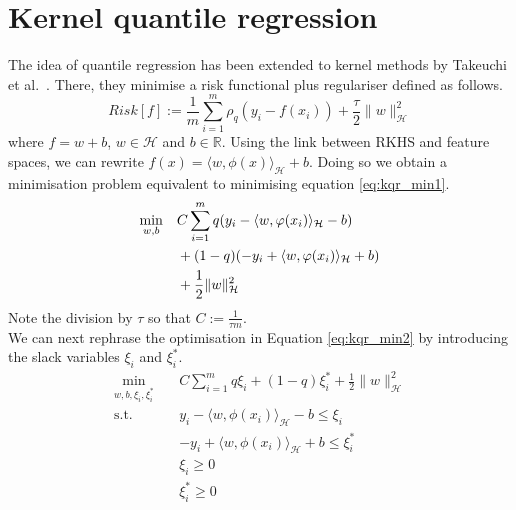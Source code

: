 \section{Kernel quantile regression}
The idea of quantile regression has been extended to kernel methods by Takeuchi et al.\ \cite{takeuchi2006nonparametric}.
There, they minimise a risk functional plus regulariser defined as follows.
\begin{equation}\label{eq:kqr_min1}
    Risk[f]:=\frac{1}{m}\sum\limits_{i=1}^{m}\rho_q(y_i-f(x_i))+\frac{\tau}{2}\|w\|_\mathcal{H}^2
\end{equation}
where $f=w+b$, $w \in \mathcal{H}$ and $b \in \mathbb{R}$.
Using the link between RKHS and feature spaces, we can rewrite $f(x)=\langle w, \phi(x) \rangle_{\mathcal{H}}+b$. 
 Doing so we obtain a minimisation problem equivalent to minimising equation \ref{eq:kqr_min1}.
\begin{equation}\label{eq:kqr_min2}
    \begin{split}
        \min_{w,b} \quad & C \sum \limits_{i=1}^{m} \hbox{$q(y_i - \langle w, \phi(x_i) \rangle_{\mathcal{H}} - b)$} \\
        & + \hbox{$(1-q)(-y_i + \langle w, \phi(x_i) \rangle_{\mathcal{H}} + b)$} \\
        & + \frac{1}{2}\|w\|_{\mathcal{H}}^2
    \end{split}
    \end{equation}
Note the division by $\tau$ so that $C:=\frac{1}{\tau m}$.
\\
We can next rephrase the optimisation in Equation \ref{eq:kqr_min2} by introducing the slack variables $\xi_i$ and $\xi_i^*$.
\begin{equation}\label{eq:kqr_min3}
    \begin{aligned}
        \min_{w,b,\xi_i,\xi_i^*} \quad & C \sum \limits_{i=1}^{m}
        q \xi_i+ (1-q)\xi_i^*+ \frac{1}{2}\|w\|_{\mathcal{H}}^2\\
    \textrm{s.t.} \quad & y_i-\langle w, \phi(x_i) \rangle_{\mathcal{H}}-b \leq \xi_i\\
    & -y_i+\langle w, \phi(x_i) \rangle_{\mathcal{H}}+b \leq \xi_i^*\\
      &\xi_i\geq0    \\
      &\xi_i^*\geq0    \\
    \end{aligned}
    \end{equation}
